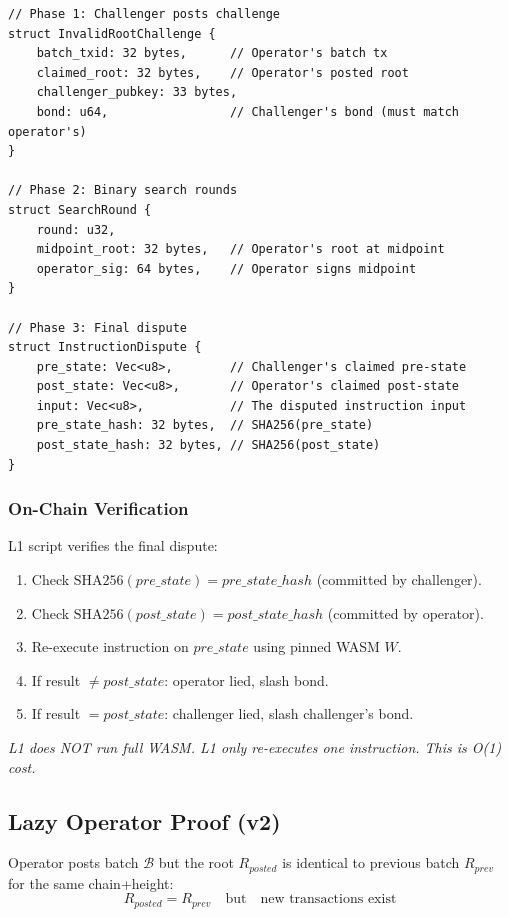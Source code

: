 \documentclass[a4paper,11pt]{article}
\begin{document}
\begin{lstlisting}[style=script]
// Phase 1: Challenger posts challenge
struct InvalidRootChallenge {
    batch_txid: 32 bytes,      // Operator's batch tx
    claimed_root: 32 bytes,    // Operator's posted root
    challenger_pubkey: 33 bytes,
    bond: u64,                 // Challenger's bond (must match operator's)
}

// Phase 2: Binary search rounds
struct SearchRound {
    round: u32,
    midpoint_root: 32 bytes,   // Operator's root at midpoint
    operator_sig: 64 bytes,    // Operator signs midpoint
}

// Phase 3: Final dispute
struct InstructionDispute {
    pre_state: Vec<u8>,        // Challenger's claimed pre-state
    post_state: Vec<u8>,       // Operator's claimed post-state
    input: Vec<u8>,            // The disputed instruction input
    pre_state_hash: 32 bytes,  // SHA256(pre_state)
    post_state_hash: 32 bytes, // SHA256(post_state)
}
\end{lstlisting}

\subsubsection{On-Chain Verification}

L1 script verifies the final dispute:
\begin{enumerate}[nosep]
    \item Check $\text{SHA256}(pre\_state) = pre\_state\_hash$ (committed by challenger).
    \item Check $\text{SHA256}(post\_state) = post\_state\_hash$ (committed by operator).
    \item Re-execute instruction on $pre\_state$ using pinned WASM $W$.
    \item If result $\neq post\_state$: operator lied, slash bond.
    \item If result $= post\_state$: challenger lied, slash challenger's bond.
\end{enumerate}

\noindent\textit{L1 does NOT run full WASM. L1 only re-executes one instruction. This is O(1) cost.}

\subsection{Lazy Operator Proof (v2)}

Operator posts batch $\mathcal{B}$ but the root $R_{posted}$ is identical to previous batch $R_{prev}$ for the same chain+height:
\[
    R_{posted} = R_{prev} \quad \text{but} \quad \text{new transactions exist}
\]
\end{document}
